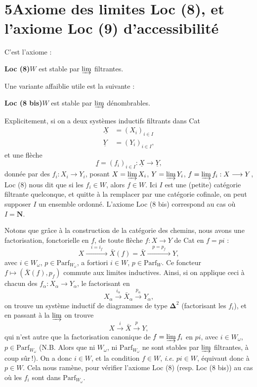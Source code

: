 \documentclass[11pt]{article}
\newcommand{\printedpage}[1]{\marginpar{\footnotesize p.~#1}}
\newcommand{\msp}[1]{\marginpar{\footnotesize [#1]}}
\newcommand{\Parf}{\mathrm{Parf}}
\begin{document}
\msp{page 71}

\printedpage{40}

\section*{5\quad Axiome des limites Loc (8), et l'axiome Loc (9) d'accessibilité}

C'est l'axiome :

\textbf{Loc (8)}\quad $W$ est stable par $\varinjlim$ filtrantes.

Une variante affaiblie utile est la suivante :

\textbf{Loc (8 bis)}\quad $W$ est stable par $\varinjlim$ dénombrables.

Explicitement, si on a deux systèmes inductifs filtrants dans Cat
\[
\begin{aligned}
\underline{X} &= (X_i)_{i\in I}\\
\underline{Y} &= (Y_i)_{i\in I},
\end{aligned}
\]
et une flèche
\[
\underline{f} = (f_i)_{i\in I} : \underline{X} \longrightarrow \underline{Y},
\]
donnée par des $f_i : X_i \longrightarrow Y_i$, posant $X = \varinjlim X_i$, $Y = \varinjlim Y_i$, $f = \varinjlim f_i : X \longrightarrow Y$, Loc (8) nous dit que si les $f_i \in W$, alors $f \in W$. Ici $I$ est
\msp{page 72}
une (petite) catégorie filtrante quelconque, et quitte à la remplacer par une catégorie cofinale, on peut supposer $I$ un ensemble ordonné. L'axiome Loc (8 bis) correspond au cas où $I = \mathbf{N}$.

Notons que grâce à la construction de la catégorie des chemins, nous avons une factorisation, fonctorielle en $f$, de toute flèche $f : X \longrightarrow Y$ de Cat en $f = pi$ :
\[
X \xrightarrow{\quad i = i_f\quad} \bar{X}(f) = \bar{X} \xrightarrow{\quad p = p_f\quad} Y,
\]
avec $i \in W_\omega$, $p \in \Parf_{W_\omega}$, a fortiori $i \in W$, $p \in \Parf_W$. Ce foncteur $f \longmapsto (\bar{X}(f), p_f)$ commute aux limites inductives. Ainsi, si on applique ceci à chacun des $f_\alpha : X_\alpha \longrightarrow Y_\alpha$, le factorisant en
\[
X_\alpha \xrightarrow{i_\alpha} \bar{X}_\alpha \xrightarrow{p_\alpha} Y_\alpha,
\]
on trouve un système inductif de diagrammes de type $\boldsymbol{\Delta}^2$ (factorisant les $f_i$), et en passant à la $\varinjlim$ on trouve
\[
X \xrightarrow{i} \bar{X} \xrightarrow{p} Y,
\]
qui n'est autre que la factorisation canonique
\msp{page 73}
de $f = \varinjlim f_i$ en $pi$, avec $i \in W_\omega$, $p \in \Parf_{W_\omega}$ (N.B. Alors que ni $W_\omega$, ni $\Parf_{W_\omega}$ ne sont stables par $\varinjlim$ filtrantes, à coup sûr\,!). On a donc $i \in W$, et la condition $f \in W$, \textit{i.e.} $pi \in W$, équivaut donc à $p \in W$. Cela nous ramène, pour vérifier l'axiome Loc (8) (resp. Loc (8 bis)) au cas où les $f_i$ sont dans $\Parf_{W_\omega}$.
\end{document}
